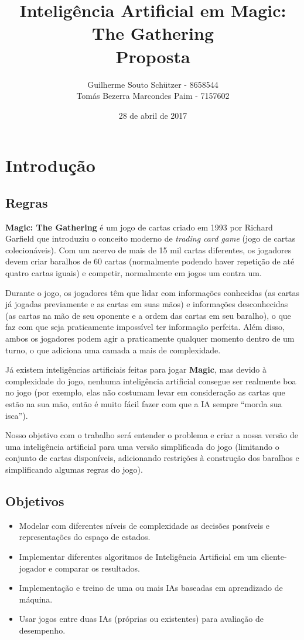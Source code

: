 \documentclass{book}
\title{Inteligência Artificial em Magic: The Gathering\\
        Proposta}
\author{Guilherme Souto Schützer - 8658544 \\
        Tomás Bezerra Marcondes Paim - 7157602}
\date{28 de abril de 2017}
\begin{document}
\maketitle

\chapter{Introdução}

\section{Regras}
\textbf{Magic: The Gathering} é um jogo de cartas criado em 1993 por Richard Garfield que introduziu o conceito moderno de \textit{trading card game} (jogo de cartas colecionáveis). Com um acervo de mais de 15 mil cartas diferentes, os jogadores devem criar baralhos de 60 cartas (normalmente podendo haver repetição de até quatro cartas iguais) e competir, normalmente em jogos um contra um.
\par Durante o jogo, os jogadores têm que lidar com informações conhecidas (as cartas já jogadas previamente e as cartas em suas mãos) e informações desconhecidas (as cartas na mão de seu oponente e a ordem das cartas em seu baralho), o que faz com que seja praticamente impossível ter informação perfeita. Além disso, ambos os jogadores podem agir a praticamente qualquer momento dentro de um turno, o que adiciona uma camada a mais de complexidade.
\par Já existem inteligências artificiais feitas para jogar \textbf{Magic}, mas devido à complexidade do jogo, nenhuma inteligência artificial consegue ser realmente boa no jogo (por exemplo, elas não costumam levar em consideração as cartas que estão na sua mão, então é muito fácil fazer com que a IA sempre ``morda sua isca'').
\par Nosso objetivo com o trabalho será entender o problema e criar a nossa versão de uma inteligência artificial para uma versão simplificada do jogo (limitando o conjunto de cartas disponíveis, adicionando restrições à construção dos baralhos e simplificando algumas regras do jogo).

\section{Objetivos}

\begin{itemize}
    \item{} Modelar com diferentes níveis de complexidade as decisões possíveis e representações do espaço de estados.
    \item{} Implementar diferentes algoritmos de Inteligência Artificial em um cliente-jogador e comparar os resultados.
    \item{} Implementação e treino de uma ou mais IAs baseadas em aprendizado de máquina.
    \item{} Usar jogos entre duas IAs (próprias ou existentes) para avaliação de desempenho.
\end{itemize}
\end{document}
